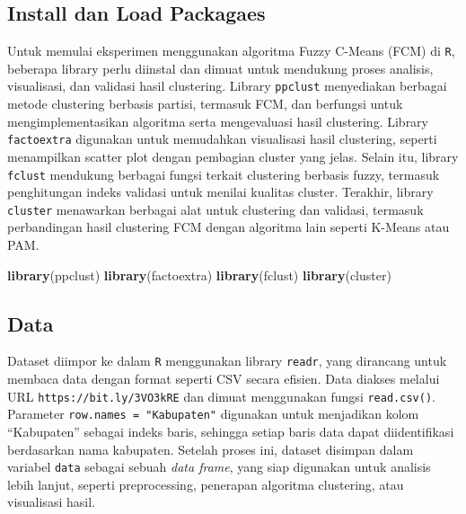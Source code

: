 \documentclass[
  oneside]{book}
\newenvironment{Shaded}{\begin{snugshade}}{\end{snugshade}}
\newcommand{\FunctionTok}[1]{\textcolor[rgb]{0.13,0.29,0.53}{\textbf{#1}}}
\newcommand{\NormalTok}[1]{#1}
\begin{document}
\subsection*{Install dan Load Packagaes}\label{install-dan-load-packagaes}

Untuk memulai eksperimen menggunakan algoritma Fuzzy C-Means (FCM) di \texttt{R}, beberapa library perlu diinstal dan dimuat untuk mendukung proses analisis, visualisasi, dan validasi hasil clustering. Library \texttt{ppclust} menyediakan berbagai metode clustering berbasis partisi, termasuk FCM, dan berfungsi untuk mengimplementasikan algoritma serta mengevaluasi hasil clustering. Library \texttt{factoextra} digunakan untuk memudahkan visualisasi hasil clustering, seperti menampilkan scatter plot dengan pembagian cluster yang jelas. Selain itu, library \texttt{fclust} mendukung berbagai fungsi terkait clustering berbasis fuzzy, termasuk penghitungan indeks validasi untuk menilai kualitas cluster. Terakhir, library \texttt{cluster} menawarkan berbagai alat untuk clustering dan validasi, termasuk perbandingan hasil clustering FCM dengan algoritma lain seperti K-Means atau PAM.

\begin{Shaded}
\begin{Highlighting}[]
\FunctionTok{library}\NormalTok{(ppclust)}
\FunctionTok{library}\NormalTok{(factoextra)}
\FunctionTok{library}\NormalTok{(fclust)}
\FunctionTok{library}\NormalTok{(cluster)}
\end{Highlighting}
\end{Shaded}

\subsection*{Data}\label{data-2}

Dataset diimpor ke dalam \texttt{R} menggunakan library \texttt{readr}, yang dirancang untuk membaca data dengan format seperti CSV secara efisien. Data diakses melalui URL \texttt{https://bit.ly/3VO3kRE} dan dimuat menggunakan fungsi \texttt{read.csv()}. Parameter \texttt{row.names\ =\ "Kabupaten"} digunakan untuk menjadikan kolom ``Kabupaten'' sebagai indeks baris, sehingga setiap baris data dapat diidentifikasi berdasarkan nama kabupaten. Setelah proses ini, dataset disimpan dalam variabel \texttt{data} sebagai sebuah \emph{data frame}, yang siap digunakan untuk analisis lebih lanjut, seperti preprocessing, penerapan algoritma clustering, atau visualisasi hasil.
\end{document}
